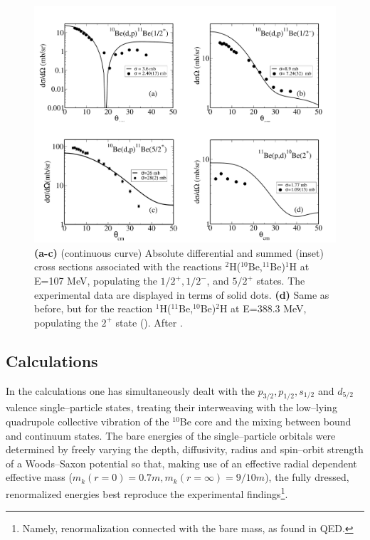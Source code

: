             \begin{figure}
            \centerline{\includegraphics*[width=16cm,angle=0]{C8/figsC8/fig6_2_5}}
            	\caption{ {\bf (a-c)} (continuous curve) Absolute differential and  summed (inset) cross sections associated with the reactions  
            	$^2$H($^{10}$Be,$^{11}$Be)$^1$H at E=107 MeV, populating the   ${1/2^+, 1/2^-}$, and ${5/2^+ }$ states.
            	The experimental data  \cite{Schmitt:13}  are displayed in terms of solid dots.
            	{\bf (d)} Same as before, but for the reaction  $^1$H($^{11}$Be,$^{10}$Be)$^2$H at E=388.3 MeV, populating the  ${2^+ }$ state 
            	(\cite{Winfield:01}). After \cite{Barranco:17}.}\label{fig6.2.5}
            \end{figure} 
\subsection{Calculations}


   In the calculations one has simultaneously dealt with the $p_{3/2}, p_{1/2},s_{1/2}$ and $d_{5/2}$ valence
   single--particle states,
   treating their interweaving with the low--lying quadrupole collective vibration
   of the $^{10}$Be core and  the mixing 
   between bound and continuum states.   
The bare energies of the single--particle orbitals were determined by freely varying the depth, diffusivity, radius and spin--orbit strength of a Woods--Saxon potential so that, making use of an effective radial dependent effective mass ($m_k(r=0)=0.7m, m_k(r=\infty)=9/10m$), the fully dressed, renormalized energies best reproduce the experimental findings\footnote{Namely, renormalization connected with the bare mass, as found in QED.}.  


